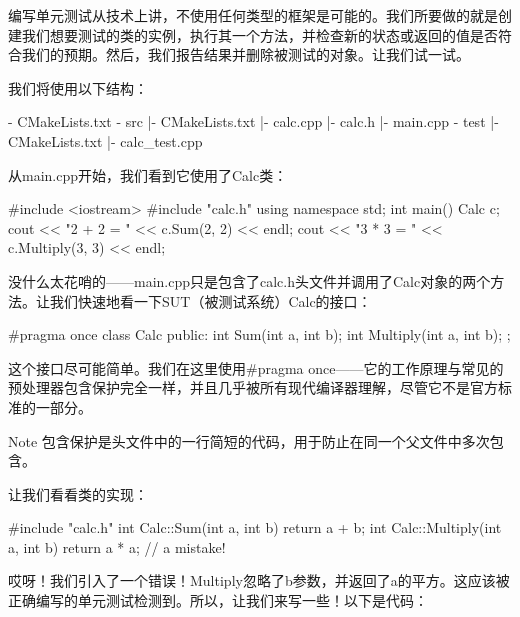 编写单元测试从技术上讲，不使用任何类型的框架是可能的。我们所要做的就是创建我们想要测试的类的实例，执行其一个方法，并检查新的状态或返回的值是否符合我们的预期。然后，我们报告结果并删除被测试的对象。让我们试一试。

我们将使用以下结构：

\begin{shell}
- CMakeLists.txt
- src
  |- CMakeLists.txt
  |- calc.cpp
  |- calc.h
  |- main.cpp
- test
  |- CMakeLists.txt
  |- calc_test.cpp
\end{shell}

从main.cpp开始，我们看到它使用了Calc类：


\begin{cpp}
#include <iostream>
#include "calc.h"
using namespace std;
int main() {
    Calc c;
    cout << "2 + 2 = " << c.Sum(2, 2) << endl;
    cout << "3 * 3 = " << c.Multiply(3, 3) << endl;
}
\end{cpp}

没什么太花哨的——main.cpp只是包含了calc.h头文件并调用了Calc对象的两个方法。让我们快速地看一下SUT（被测试系统）Calc的接口：


\begin{cpp}
#pragma once
class Calc {
    public:
    int Sum(int a, int b);
    int Multiply(int a, int b);
};
\end{cpp}

这个接口尽可能简单。我们在这里使用\#pragma once——它的工作原理与常见的预处理器包含保护完全一样，并且几乎被所有现代编译器理解，尽管它不是官方标准的一部分。

\begin{myNotic}{Note}
包含保护是头文件中的一行简短的代码，用于防止在同一个父文件中多次包含。
\end{myNotic}

让我们看看类的实现：


\begin{cpp}
#include "calc.h"
int Calc::Sum(int a, int b) {
    return a + b;
}
int Calc::Multiply(int a, int b) {
    return a * a; // a mistake!
}
\end{cpp}

哎呀！我们引入了一个错误！Multiply忽略了b参数，并返回了a的平方。这应该被正确编写的单元测试检测到。所以，让我们来写一些！以下是代码：

